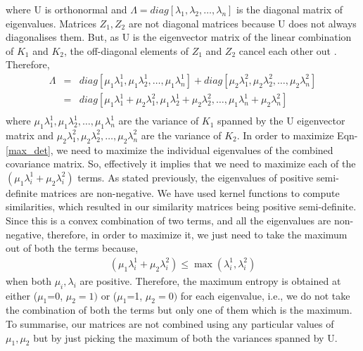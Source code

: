 where U is orthonormal and $\Lambda=diag[\lambda_{1},\lambda_{2},\dots,\lambda_{n}]$ is the diagonal matrix of eigenvalues. Matrices $Z_{1},Z_{2}$ are not diagonal matrices because U does not always diagonalises them. But, as U is the eigenvector matrix of the linear combination of $K_{1}$ and $K_{2}$, the off-diagonal elements of $Z_{1}$ and $Z_{2}$ cancel each other out \citep{thomaz2004covariance, carlos05maximum}. Therefore,
\begin{eqnarray}
\Lambda  &=& diag[\mu_{1}\lambda^{1}_{1},\mu_{1}\lambda^{1}_{2},\dots,\mu_{1}\lambda^{1}_{n}]+ diag[\mu_{2}\lambda^{2}_{1},\mu_{2}\lambda^{2}_{2},\dots,\mu_{2}\lambda^{2}_{n}] \label{eigv_split_2} \\
&=& diag[\mu_{1}\lambda^{1}_{1}+\mu_{2}\lambda^{2}_{1}, \mu_{1}\lambda^{1}_{2}+\mu_{2}\lambda^{2}_{2},\dots,\mu_{1}\lambda^{1}_{n}+\mu_{2}\lambda^{2}_{n}]  \\ 
\end{eqnarray}
where $\mu_{1}\lambda^{1}_{1},\mu_{1}\lambda^{1}_{2},\dots,\mu_{1}\lambda^{1}_{n}$ are the variance of $K_{1}$ spanned by the U eigenvector matrix and $\mu_{2}\lambda^{2}_{1},\mu_{2}\lambda^{2}_{2},\dots,\mu_{2}\lambda^{2}_{n}$ are the variance of $K_{2}$. In order to maximize Eqn-\eqref{max_det}, we need to maximize the individual eigenvalues of the combined covariance matrix. So, effectively it implies that we need to maximize each of the $(\mu_{1}\lambda^{1}_{i}+\mu_{2}\lambda^{2}_{i})$ terms. As stated previously, the eigenvalues of positive semi-definite matrices are non-negative. We have used kernel functions to compute similarities, which resulted in our similarity matrices being positive semi-definite. Since this is a convex combination of two terms, and all the eigenvalues are non-negative, therefore, in order to maximize it, we just need to take the maximum out of both the terms because,
\begin{eqnarray}
(\mu_{1}\lambda^{1}_{i}+\mu_{2}\lambda^{2}_{i}) \leq \max (\lambda^{1}_{i},\lambda^{2}_{i})
\end{eqnarray} 
when both $\mu_{i},\lambda_{i}$ are positive. Therefore, the maximum entropy is obtained at either ($\mu_{1}$=0, $\mu_{2}=1)$ or ($\mu_{1}$=1, $\mu_{2}=0)$ for each eigenvalue, i.e., we do not take the combination of both the terms but only one of them which is the maximum. To summarise, our matrices are not combined using any particular values of $\mu_{1},\mu_{2}$ but by just picking the maximum of both the variances spanned by U. 

